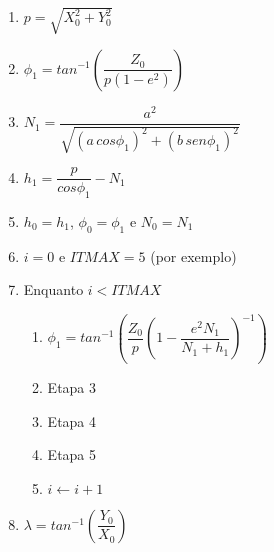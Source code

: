 \documentclass[10pt,a4paper]{article}
\begin{document}
\begin{enumerate}

\item $p = \sqrt{X_{0}^{2} + Y_{0}^{2}}$

\item $\phi_{1} = tan^{-1} \left( \dfrac{Z_{0}}{p (1 - e^{2})} 
                           \right)$

\item $N_{1} = \dfrac{a^{2}}{\sqrt{\left( a \, cos\phi_{1} \right)^{2} + 
                                   \left( b \, sen\phi_{1} \right)^{2}}}$

\item $h_{1} = \dfrac{p}{cos\phi_{1}} - N_{1}$

\item $h_{0} = h_{1}$, $\phi_{0} = \phi_{1}$ e $N_{0} = N_{1}$

\item $i = 0$ e $ITMAX = 5$ (por exemplo)

\item Enquanto $i < ITMAX$

\begin{enumerate}

\item $\phi_{1} = tan^{-1} \left( \dfrac{Z_{0}}{p} 
                           \left( 1 - \dfrac{e^{2} N_{1}}{N_{1} + h_{1}} 
                           \right)^{-1}
                           \right)$
\item Etapa 3

\item Etapa 4

\item Etapa 5

\item $i \leftarrow i + 1$

\end{enumerate}

\item $\lambda = tan^{-1} \left( \dfrac{Y_{0}}{X_{0}} \right)$

\end{enumerate}
\end{document}

